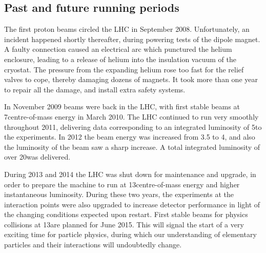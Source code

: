 \subsection{Past and future running periods}

The first proton beams circled the LHC in September 2008. Unfortunately, an incident happened
shortly thereafter, during powering tests of the dipole magnet. A faulty connection caused  an
electrical
arc which punctured the helium enclosure, leading to a release of helium into the insulation vacuum
of
the cryostat. The pressure from the expanding helium rose too fast for the relief valves to cope,
thereby damaging dozens of magnets. It took more than one year to repair all the damage, and
install extra safety systems. 

In November 2009 beams were back in the LHC, with first stable beams
at 7\TeV centre-of-mass energy in March 2010. The LHC continued to run very smoothly throughout
2011, delivering data corresponding to an integrated luminosity of 5\fbinv to the experiments.  
In 2012 the beam energy was increased from 3.5 to 4\TeV, and also the luminosity of the beam saw a
sharp increase. A total integrated luminosity of over 20\fbinv was delivered. 

During 2013 and 2014 the LHC was shut down for maintenance and upgrade, in order to prepare the
machine to run at 13\TeV centre-of-mass energy and higher instantaneous luminosity. During these two
years, the experiments at the interaction points were also upgraded to increase detector performance
in light of the changing conditions expected upon restart. 
First stable beams for physics collisions at 13\TeV are planned for June 2015. This will signal the
start of a very exciting time for particle physics, during which our understanding of elementary
particles and their interactions will undoubtedly change. 


